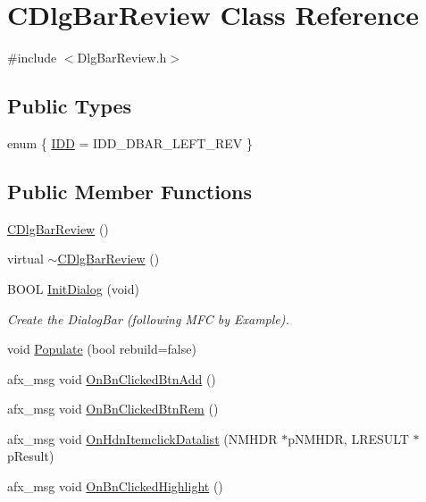 \hypertarget{classCDlgBarReview}{
\section{CDlgBarReview Class Reference}
\label{classCDlgBarReview}
}


{\ttfamily \#include $<$DlgBarReview.h$>$}

\subsection*{Public Types}
\begin{DoxyCompactItemize}
\item 
enum \{ \hyperlink{classCDlgBarReview_a6a9a9fee783a324a502b8a996c5fe351a4f7775206eb9222335a9760f01574102}{IDD} =  IDD\_\-DBAR\_\-LEFT\_\-REV
 \}
\end{DoxyCompactItemize}
\subsection*{Public Member Functions}
\begin{DoxyCompactItemize}
\item 
\hyperlink{classCDlgBarReview_a39ed288d86c5a404465c0f68ca94129a}{CDlgBarReview} ()
\item 
virtual \hyperlink{classCDlgBarReview_a763692b531f29c8f47a0adcd9a939563}{$\sim$CDlgBarReview} ()
\item 
BOOL \hyperlink{classCDlgBarReview_a5d0f6cf78daf0a71e5e324f508c993b0}{InitDialog} (void)
\begin{DoxyCompactList}\small\item\em Create the DialogBar (following MFC by Example). \item\end{DoxyCompactList}\item 
void \hyperlink{classCDlgBarReview_a6d06dfe4cd5b301dbdfa01c9d146b9b9}{Populate} (bool rebuild=false)
\item 
afx\_\-msg void \hyperlink{classCDlgBarReview_ab97ce669cb92620066b5aa7f31ec256f}{OnBnClickedBtnAdd} ()
\item 
afx\_\-msg void \hyperlink{classCDlgBarReview_a0e3219ca7edf5ea4af9be4a22b942591}{OnBnClickedBtnRem} ()
\item 
afx\_\-msg void \hyperlink{classCDlgBarReview_a2f447c2a18f204606cccbfcc0bb372ec}{OnHdnItemclickDatalist} (NMHDR $\ast$pNMHDR, LRESULT $\ast$pResult)
\item 
afx\_\-msg void \hyperlink{classCDlgBarReview_ac25c2baa6be7dad7199f3ea6654eb328}{OnBnClickedHighlight} ()
\end{DoxyCompactItemize}
